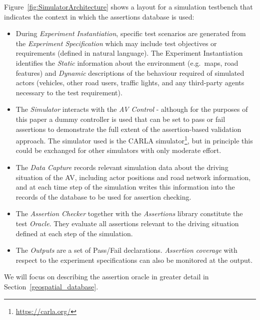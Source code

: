   Figure~\ref{fig:SimulatorArchitecture} shows a layout for a simulation testbench that indicates the context in which the assertions database is used:

  \begin{itemize}
      \item During \emph{Experiment Instantiation}, specific test scenarios are generated from the \emph{Experiment Specification} which may include test objectives or requirements (defined in natural language). The Experiment Instantiation identifies the \emph{Static} information about the environment (e.g.\ maps, road features) and \emph{Dynamic} descriptions of the behaviour required of simulated actors (vehicles, other road users, traffic lights, and any third-party agents necessary to the test requirement). 

      \item The \emph{Simulator} interacts with the \emph{AV Control} - although for the purposes of this paper a dummy controller is used that can be set to pass or fail assertions to demonstrate the full extent of the assertion-based validation approach. The simulator used is the CARLA simulator\footnote{\url{https://carla.org/}}, but in principle this could be exchanged for other simulators with only moderate effort.
      \item The \emph{Data Capture} records relevant simulation data about the driving situation of the AV, including actor positions and road network information, and at each time step of the simulation writes this information into the records of the database to be used for assertion checking.
      \item The \emph{Assertion Checker} together with the \emph{Assertions} library constitute the test \emph{Oracle}. They evaluate all assertions relevant to the driving situation defined at each step of the simulation. 
      \item The \emph{Outputs} are a set of Pass/Fail declarations.
\emph{Assertion coverage} with respect to the experiment specifications can also be monitored at the output. 
  \end{itemize}
  We will focus on describing the assertion oracle in greater detail in %
  Section~\ref{geospatial_database}.

